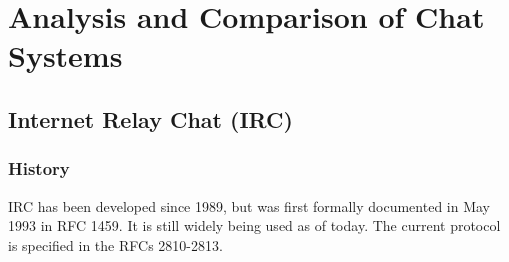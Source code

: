 \chapter{Analysis and Comparison of Chat Systems}
\label{chatsystems}
\section{Internet Relay Chat (IRC)}
\subsection{History}
IRC has been developed since 1989, but was first formally documented in May 1993 in 
RFC 1459. It is still widely being used as of today.\cite{rfc1459,ircusage}
The current protocol is specified in the RFCs 2810-2813.\cite{rfc2810,rfc2811,rfc2812,rfc2813}
